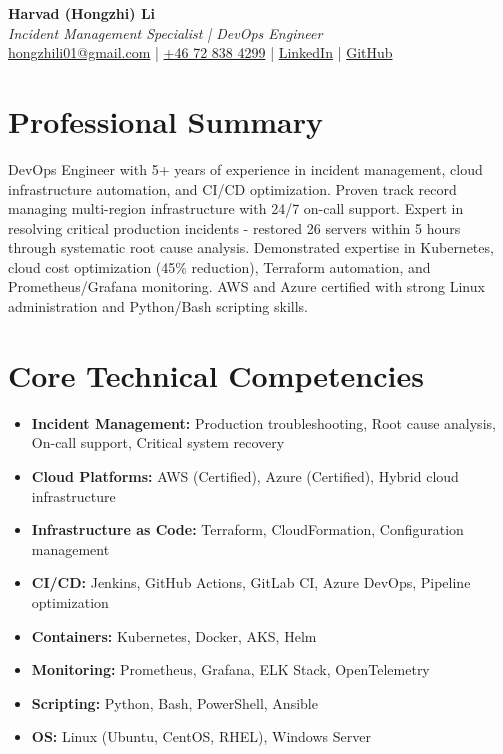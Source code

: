 \documentclass[11pt,a4paper]{article}
\begin{document}
\begin{center}
{\LARGE \textbf{Harvad (Hongzhi) Li}}\\[10pt]
{\Large \textit{Incident Management Specialist | DevOps Engineer}}\\[10pt]
\textcolor{linkedinblue}{\href{mailto:hongzhili01@gmail.com}{hongzhili01@gmail.com} | \href{tel:+46728384299}{+46 72 838 4299} | \href{https://www.linkedin.com/in/harvad/}{LinkedIn} | \href{https://github.com/bluehawana}{GitHub}}
\end{center}

\vspace{8pt}

\section*{Professional Summary}

DevOps Engineer with 5+ years of experience in incident management, cloud infrastructure automation, and CI/CD optimization. Proven track record managing multi-region infrastructure with 24/7 on-call support. Expert in resolving critical production incidents - restored 26 servers within 5 hours through systematic root cause analysis. Demonstrated expertise in Kubernetes, cloud cost optimization (45\% reduction), Terraform automation, and Prometheus/Grafana monitoring. AWS and Azure certified with strong Linux administration and Python/Bash scripting skills.

\section*{Core Technical Competencies}

\begin{itemize}[leftmargin=*, itemsep=2pt]
\item \textbf{Incident Management:} Production troubleshooting, Root cause analysis, On-call support, Critical system recovery
\item \textbf{Cloud Platforms:} AWS (Certified), Azure (Certified), Hybrid cloud infrastructure
\item \textbf{Infrastructure as Code:} Terraform, CloudFormation, Configuration management
\item \textbf{CI/CD:} Jenkins, GitHub Actions, GitLab CI, Azure DevOps, Pipeline optimization
\item \textbf{Containers:} Kubernetes, Docker, AKS, Helm
\item \textbf{Monitoring:} Prometheus, Grafana, ELK Stack, OpenTelemetry
\item \textbf{Scripting:} Python, Bash, PowerShell, Ansible
\item \textbf{OS:} Linux (Ubuntu, CentOS, RHEL), Windows Server
\end{itemize}
\end{document}
